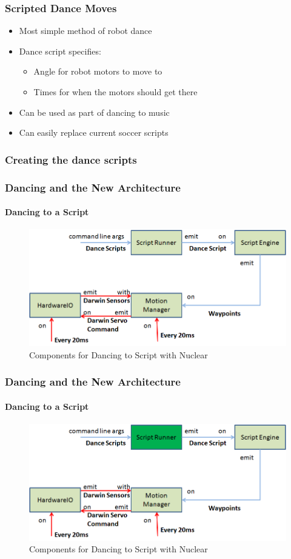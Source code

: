 \documentclass{beamer}
\begin{document}
	\begin{frame}
		\frametitle{Scripted Dance Moves}
		\begin{itemize}
			\item Most simple method of robot dance
			\item Dance script specifies:
			\begin{itemize}
				\item Angle for robot motors to move to
				\item Times for when the motors should get there
			\end{itemize}
			\item Can be used as part of dancing to music
			\item Can easily replace current soccer scripts
		\end{itemize}
	\end{frame}	
	\begin{frame}
		\frametitle{Creating the dance scripts}
	\end{frame}	
	\begin{frame}
		\frametitle{Dancing and the New Architecture}
		\framesubtitle{Dancing to a Script}
		\begin{figure}
			\centering
			\includegraphics[scale=.5]{Presentation_Images/dance_script_new_arc.png}
			\caption{Components for Dancing to Script with Nuclear}
		\end{figure}
	\end{frame}	
	\begin{frame}
		\frametitle{Dancing and the New Architecture}
		\framesubtitle{Dancing to a Script}
		\begin{figure}
			\centering
			\includegraphics[scale=.5]{Presentation_Images/dance_script_new_arc_change.png}
			\caption{Components for Dancing to Script with Nuclear}
		\end{figure}
	\end{frame}	
\end{document}

